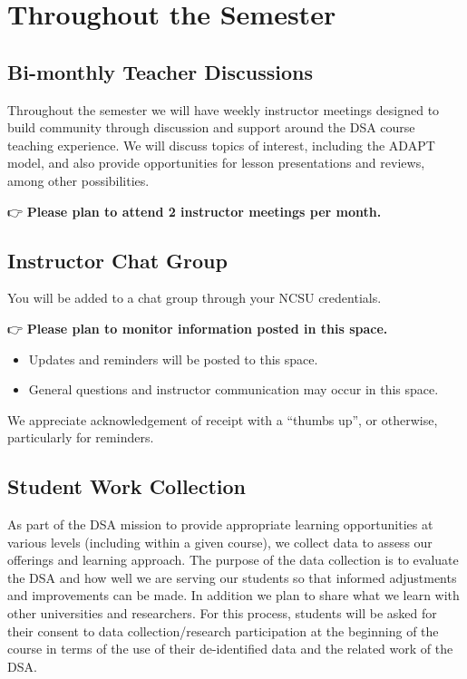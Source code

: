 \documentclass[
]{book}
\providecommand{\tightlist}{%
  \setlength{\itemsep}{0pt}\setlength{\parskip}{0pt}}
\begin{document}
\section{Throughout the Semester}\label{throughout-the-semester}

\subsection{Bi-monthly Teacher Discussions}\label{bi-monthly-teacher-discussions}

Throughout the semester we will have weekly instructor meetings designed to build community through discussion and support around the DSA course teaching experience. We will discuss topics of interest, including the ADAPT model, and also provide opportunities for lesson presentations and reviews, among other possibilities.

👉 { \textbf{Please plan to attend 2 instructor meetings per month.} }

\subsection{Instructor Chat Group}\label{instructor-chat-group}

You will be added to a chat group through your NCSU credentials.

👉 { \textbf{Please plan to monitor information posted in this space.} }

\begin{itemize}
\tightlist
\item
  Updates and reminders will be posted to this space.
\item
  General questions and instructor communication may occur in this space.
\end{itemize}

We appreciate acknowledgement of receipt with a ``thumbs up'', or otherwise, particularly for reminders.

\subsection{Student Work Collection}\label{student-work-collection}

As part of the DSA mission to provide appropriate learning opportunities at various levels (including within a given course), we collect data to assess our offerings and learning approach. The purpose of the data collection is to evaluate the DSA and how well we are serving our students so that informed adjustments and improvements can be made. In addition we plan to share what we learn with other universities and researchers. For this process, students will be asked for their consent to data collection/research participation at the beginning of the course in terms of the use of their de-identified data and the related work of the DSA.
\end{document}
